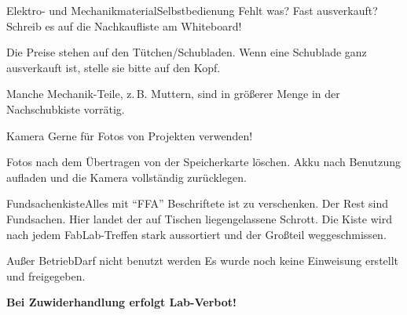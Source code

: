 \begin{schild}[farbe=gruen, seite=kosten]
	{Elektro- und Mechanikmaterial}{Selbstbedienung}
Fehlt was? Fast ausverkauft? Schreib es auf die Nachkaufliste am Whiteboard!

Die Preise stehen auf den Tütchen/Schubladen. Wenn eine Schublade ganz ausverkauft ist,
stelle sie bitte auf den Kopf.

Manche Mechanik-Teile, z.\,B. Muttern, sind in größerer Menge in der Nachschubkiste vorrätig.
\end{schild}

\begin{schild}[farbe=gruen, modell=FabLab-Kamera]
	{Kamera}{\werkstattEinweisung}
Gerne für Fotos von Projekten verwenden!

Fotos nach dem Übertragen von der Speicherkarte löschen.
Akku nach Benutzung aufladen und die Kamera vollständig zurücklegen.
\end{schild}

\begin{schild}[farbe=gruen]
	{Fundsachenkiste}{Alles mit \enquote{FFA} Beschriftete ist zu verschenken. Der Rest sind Fundsachen.}
Hier landet der auf Tischen liegengelassene Schrott. Die Kiste wird nach jedem
FabLab-Treffen stark aussortiert und der Großteil weggeschmissen.
\end{schild}

\begin{schild}[farbe=rot, modell={Gerät: \rule{6cm}{0.4pt}}, startseite]
	{Außer Betrieb}{Darf nicht benutzt werden}
Es wurde noch keine Einweisung erstellt und freigegeben.

\textbf{Bei Zuwiderhandlung erfolgt Lab-Verbot!}
\end{schild}
